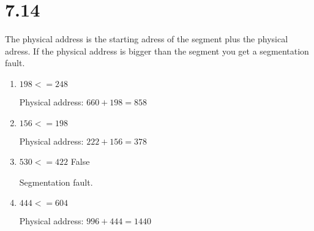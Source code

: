 \documentclass[12pt]{article}
\begin{document}
\section*{7.14}
The physical address is the starting adress of the segment plus the physical adress. If the physical address is bigger than the segment you get a segmentation fault.

\begin{enumerate}[]
	\item %
	$198 <= 248$ \checkmark

	Physical address: $660 + 198 = 858$

	\item %
	$156 <= 198$ \checkmark

	Physical address: $222 + 156 = 378$

	\item %
	$530 <= 422$ False

	Segmentation fault.

	\item %
	$444 <= 604$ \checkmark

	Physical address: $996 + 444 = 1440$
\end{enumerate}
\end{document}
